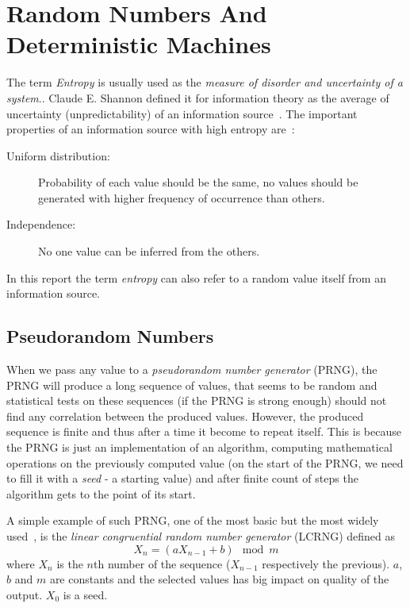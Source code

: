 \chapter{Random Numbers And Deterministic Machines}\label{chap:randomNumbers}


The term {\em Entropy} is usually used  as the {\em measure of disorder and uncertainty of a system}.\cite{Entrophy}. Claude E. Shannon defined it for information theory as the average of uncertainty (unpredictability) of an information source~\cite[p.~396]{AMathematicalTheoryOfCommunication}. The important properties of an information source with high entropy are~\cite[p.~150]{CryptographyAndNetworkSecurity}: 
\begin{description}
 \item [Uniform distribution:] Probability of each value should be the same, no values should be generated with higher frequency of occurrence than others.
 \item [Independence:] No one value can be inferred from the others.
\end{description}


In this report the term {\em entropy} can also refer to a random value itself from an information source. 



\section{Pseudorandom Numbers}
When we pass any value to a {\em pseudorandom number generator} (PRNG), the PRNG will produce a long sequence of values, that seems to be random and statistical tests on these sequences (if the PRNG is strong enough) should not find any correlation between the produced values. However, the produced sequence is finite and thus after a time it become to repeat itself. This is because the PRNG is just an implementation of an algorithm, computing mathematical operations on the previously computed value (on the start of the PRNG, we need to fill it with a {\em seed} - a starting value) and after finite count of steps the algorithm gets to the point of its start.

A simple example of such PRNG, one of the most basic but the most widely used~\cite[p.~151]{CryptographyAndNetworkSecurity}, is the {\em linear congruential random number generator} (LCRNG) defined as 
\begin{equation}\label{eq:LCRNG}
  X_n = (aX_{n-1} + b) \mod{m}
\end{equation}
where $X_n$ is the $n$th number of the sequence ($X_{n-1}$ respectively the previous). $a$, $b$ and $m$ are constants and the selected values has big impact on quality of the output. $X_0$ is a seed. 

